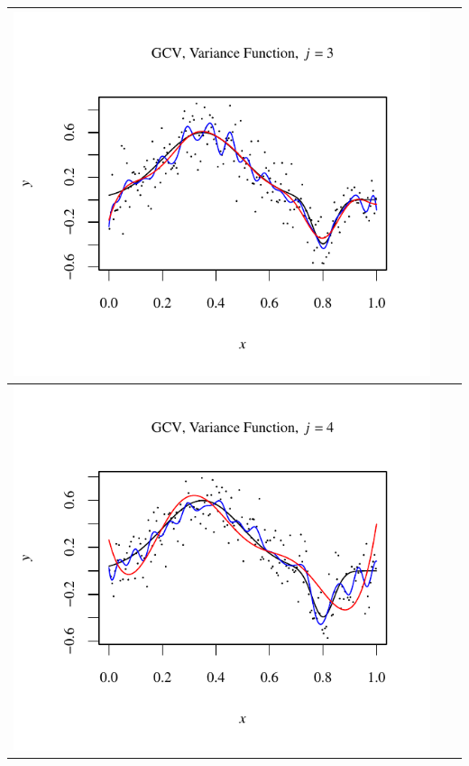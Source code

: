 \documentclass[11pt]{article}
\begin{document}
\begin{table}[h!]
\begin{center}
\begin{tabular}{| >{\centering\arraybackslash}m{2.1in} |  >{\centering\arraybackslash}m{2.1in} |  >{\centering\arraybackslash}m{2.1in}|}
      \includegraphics[width=1\linewidth,height=0.18\textheight]{Graphs/2/4/assignment5_a_2_4_3}\\\hline
      \includegraphics[width=1\linewidth,height=0.18\textheight]{Graphs/2/4/assignment5_a_2_4_4}&

\end{tabular}
\end{center}
\end{table}
\end{document}
